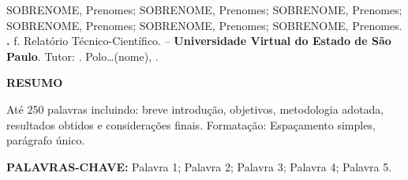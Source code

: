 \clearpage
{}
\thispagestyle{empty}

\noindent
SOBRENOME, Prenomes; SOBRENOME, Prenomes; SOBRENOME, Prenomes; SOBRENOME,
Prenomes; SOBRENOME, Prenomes; SOBRENOME, Prenomes. \textbf{\doctitulo.}
\docpaginas f. Relatório Técnico-Científico. \doccurso{} --
\textbf{Universidade Virtual do Estado de São Paulo}. Tutor:
\doctutor. Polo\ldots(nome), \docano.

\vspace{\baselineskip}

\begin{center}
    \textbf{RESUMO}
\end{center}

\begin{singlespace}
\noindent
Até 250 palavras incluindo: breve introdução, objetivos, metodologia
adotada, resultados obtidos e considerações finais. Formatação: Espaçamento
simples, parágrafo único.
\end{singlespace}

\vspace{\baselineskip}

\noindent
\textbf{PALAVRAS-CHAVE:} Palavra 1; Palavra 2; Palavra 3; Palavra 4;
Palavra 5.
